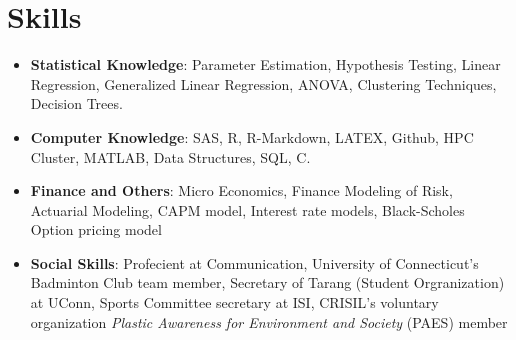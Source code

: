 \documentclass[letterpaper,11pt]{article}
\newcommand{\resumeItem}[2]{
  \item\small{
    \textbf{#1}{: #2 \vspace{-2pt}}
  }
}
\newcommand{\resumeSubItem}[2]{\resumeItem{#1}{#2}\vspace{-4pt}}
\newcommand{\resumeSubHeadingListStart}{\begin{itemize}[leftmargin=*]}
\newcommand{\resumeSubHeadingListEnd}{\end{itemize}}
\begin{document}
\section{Skills}
  \resumeSubHeadingListStart
    \resumeSubItem{Statistical Knowledge}
      {Parameter Estimation, Hypothesis Testing, Linear Regression, Generalized Linear Regression, ANOVA, Clustering Techniques, Decision Trees.}
    \resumeSubItem{Computer Knowledge}
      {SAS, R, R-Markdown, LATEX, Github, HPC Cluster, MATLAB, Data Structures, SQL, C.}
    \resumeSubItem{Finance and Others}
      {Micro Economics, Finance Modeling of Risk, Actuarial Modeling, CAPM model, Interest rate models, Black-Scholes Option pricing model}
    \resumeSubItem{Social Skills}
      {Profecient at Communication, University of Connecticut's Badminton Club team member, Secretary of Tarang (Student Orgranization) at UConn, Sports Committee secretary at ISI, CRISIL's voluntary organization \textit{Plastic Awareness for Environment and Society} (PAES) member}      
  \resumeSubHeadingListEnd

%


\end{document}
